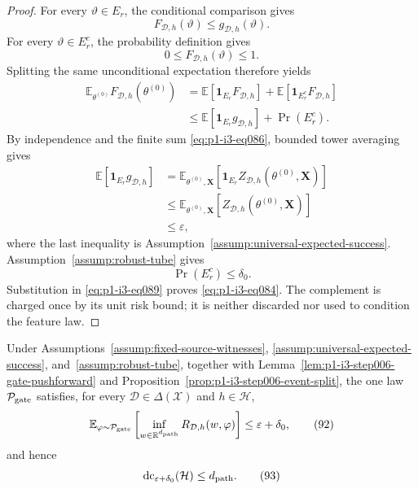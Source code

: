 \begin{proof}
For every $\vartheta\in E_r$, the conditional comparison gives
\[
F_{\mathcal D,h}(\vartheta)\leq g_{\mathcal D,h}(\vartheta).
\tag{87}\label{eq:p1-i3-eq087}
\]
For every $\vartheta\in E_r^c$, the probability definition gives
\[
0\leq F_{\mathcal D,h}(\vartheta)\leq1.
\tag{88}\label{eq:p1-i3-eq088}
\]
Splitting the same unconditional expectation therefore yields
\[
\begin{aligned}
\mathbb E_{\theta^{(0)}}F_{\mathcal D,h}(\theta^{(0)})
&=\mathbb E[\mathbf1_{E_r}F_{\mathcal D,h}]
 +\mathbb E[\mathbf1_{E_r^c}F_{\mathcal D,h}]\\
&\leq\mathbb E[\mathbf1_{E_r}g_{\mathcal D,h}]
 +\Pr(E_r^c).
\end{aligned}
\tag{89}\label{eq:p1-i3-eq089}
\]
By independence and the finite sum \eqref{eq:p1-i3-eq086}, bounded tower averaging gives
\[
\begin{aligned}
\mathbb E[\mathbf1_{E_r}g_{\mathcal D,h}]
&=\mathbb E_{\theta^{(0)},\mathbf X}
[\mathbf1_{E_r}Z_{\mathcal D,h}(\theta^{(0)},\mathbf X)]\\
&\leq\mathbb E_{\theta^{(0)},\mathbf X}
[Z_{\mathcal D,h}(\theta^{(0)},\mathbf X)]\\
&\leq\varepsilon,
\end{aligned}
\tag{90}\label{eq:p1-i3-eq090}
\]
where the last inequality is Assumption~\ref{assump:universal-expected-success}.
Assumption~\ref{assump:robust-tube} gives
\[
\Pr(E_r^c)\leq\delta_0.
\tag{91}\label{eq:p1-i3-eq091}
\]
Substitution in \eqref{eq:p1-i3-eq089} proves \eqref{eq:p1-i3-eq084}.  The complement is charged once by its
unit risk bound; it is neither discarded nor used to condition the feature
law.
\end{proof}

\begin{proposition}
\label{prop:p1-i3-step006-dc-witness}
Under Assumptions~\ref{assump:fixed-source-witnesses},
\ref{assump:universal-expected-success}, and~\ref{assump:robust-tube},
together with Lemma~\ref{lem:p1-i3-step006-gate-pushforward} and
Proposition~\ref{prop:p1-i3-step006-event-split}, the one law
$\mathcal P_{\rm gate}$ satisfies, for every
$\mathcal D\in\Delta(\mathcal X)$ and $h\in\mathcal H$,
\[
\mathbb E_{\varphi\sim\mathcal P_{\rm gate}}
\left[\inf_{w\in\mathbb R^{d_{\rm path}}}
R_{\mathcal D,h}(w,\varphi)\right]\leq\varepsilon+\delta_0,
\tag{92}\label{eq:p1-i3-eq092}
\]
and hence
\[
\operatorname{dc}_{\varepsilon+\delta_0}(\mathcal H)
\leq d_{\rm path}.
\tag{93}\label{eq:p1-i3-eq093}
\]
\end{proposition}

